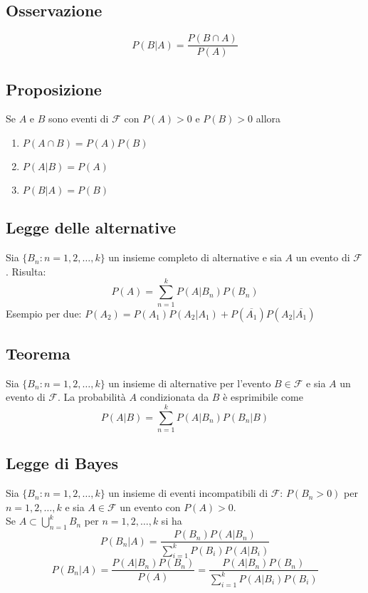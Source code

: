\begin{multicols*}{2}
\subsection*{Osservazione}
$$
P(B|A) = \frac{P(B \cap A)}{P(A)}
$$

\subsection*{Proposizione}
Se $A$ e $B$ sono eventi di $\mathscr{F}$ con $P(A) > 0$ e $P(B) > 0$ allora
\begin{enumerate}
    \item $P(A \cap B) = P(A)P(B)$
    \item $P(A|B) = P(A)$
    \item $P(B|A) = P(B)$
\end{enumerate}

\subsection*{Legge delle alternative}
Sia $\{B_n : n = 1,2,\dots,k\}$ un insieme completo di alternative e sia $A$ 
un evento di $\mathscr{F}$. Risulta:
$$
P(A) = \sum_{n=1}^{k}P(A|B_n)P(B_n)
$$
Esempio per due: $P(A_2) = P(A_1)P(A_2 | A_1) + P(\overline{A_1})P(A_2 | \overline{A_1})$

\end{multicols*}

\subsection*{Teorema}
Sia $\{B_n : n = 1,2,\dots,k\}$ un insieme di alternative per l'evento $B \in \mathscr{F}$ e
sia $A$ un evento di $\mathscr{F}$. La probabilità $A$ condizionata da $B$ è esprimibile come
$$
P(A|B) = \sum_{n=1}^{k}P(A | B_n)P(B_n|B)
$$

\subsection*{Legge di Bayes}
Sia $\{B_n : n = 1,2,\dots,k\}$ un insieme di eventi incompatibili di $\mathscr{F}$: 
$P(B_n > 0)$ per $n = 1,2,\dots,k$ e sia $A \in \mathscr{F}$ un evento con $P(A) > 0$.\\
Se $\displaystyle A \subset \bigcup_{n=1}^{k} B_n$ per $n = 1,2,\dots,k$ si ha
$$
P(B_n|A) = \frac{P(B_n)P(A|B_n)}{\displaystyle \sum_{i=1}^{k}P(B_i)P(A|B_i)}
$$
$$
P(B_n|A) = \frac{P(A|B_n)P(B_n)}{P(A)} = \frac{P(A|B_n)P(B_n)}{\displaystyle 
\sum_{i=1}^{k}P(A|B_i)P(B_i)}
$$